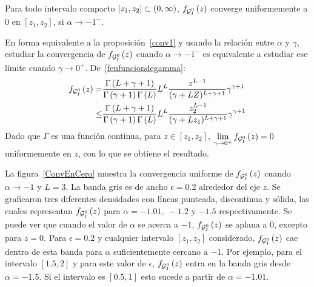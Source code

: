 \begin{proposition}
	\label{conv2}
	Para todo intervalo compacto $[z_{1},z_{2}]\subset\left( 0,\infty \right)$, $f_{\mathcal{G}_I^0}\left( z \right)$ converge
	uniformemente a $0$ en $[z_{1},z_{2}]$, si $\alpha\to -1^{-}$.
\end{proposition}
\begin{dem}
	En forma equivalente a la proposición~\ref{conv1} y usando la relación entre $\alpha$ y $\gamma$, estudiar la convergencia de $f_{\mathcal{G}_I^0}\left( z \right)$ cuando $\alpha\to -1^{-}$ es equivalente a estudiar ese límite cuando ${\gamma\to 0^{+}}$.
	De~\eqref{fenfunciondegamma}:
	\begin{align*}
	f_{\mathcal{G}_I^0}\left( z \right) = &\frac{\Gamma\left( L+\gamma+1 \right)}{\Gamma\left( \gamma+1 \right)\Gamma\left( L \right)}
	L^{L} \frac{z^{L-1}}{(\gamma+LZ)^{L+\gamma+1}} \gamma^{\gamma +1}  \\
	\leq& \frac{\Gamma\left( L+\gamma+1 \right)}{\Gamma\left( \gamma+1 \right)\Gamma\left( L \right)}
	L^{L} \frac{z_2^{L-1}}{(\gamma+Lz_1)^{L+\gamma+1}} \gamma^{\gamma +1} 
	\end{align*}
	Dado que $\Gamma$ es una función continua, para $z \in [z_{1},z_{2}]$, $\lim\limits_{\gamma\to0^+} f_{\mathcal{G}_I^0}\left( z \right)=0$ uniformemente en $z$, con lo que se obtiene el resultado.
\end{dem}

La figura~\ref{ConvEnCero} muestra la convergencia uniforme de $f_{\mathcal{G}_I^0}\left( z \right)$ cuando $\alpha \to -1$ y $L=3$. La banda gris es de ancho $\epsilon=0.2$ alrededor del eje $z$. 
Se graficaron tres diferentes densidades con líneas punteada, discontinua y sólida, las cuales representan $f_{\mathcal{G}_I^0}\left( z \right)$ para $\alpha=-1.01, \ -1.2$ y $-1.5$ respectivamente. 
Se puede ver que cuando el valor de $\alpha$ se acerca a $-1$, $f_{\mathcal{G}_I^0}\left( z \right)$ se aplana a $0$, excepto para $z=0$. 
Para  $\epsilon=0.2$ y cualquier intervalo $[z_1,z_2]$ considerado, $f_{\mathcal{G}_I^0}\left( z \right)$ cae dentro de esta banda para $\alpha$ suficientemente cercano a $-1$. 
Por ejemplo, para el intervalo $[1.5,2]$ y para este valor de $\epsilon$, $f_{\mathcal{G}_I^0}\left( z \right)$ entra en la banda gris desde $\alpha=-1.5$. 
Si el intervalo es $[0.5,1]$ esto sucede a partir de $\alpha=-1.01$.



